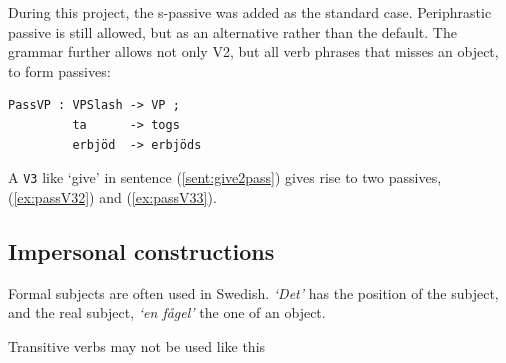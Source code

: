 \documentclass{report}
\begin{document}
During this project, the s-passive was added as the standard case.
Periphrastic passive is still allowed, but as an alternative rather
than the default.
The grammar further allows not only V2, but all verb phrases that misses an object, to 
form passives:
\begin{verbatim}
PassVP : VPSlash -> VP ;
         ta      -> togs
         erbjöd  -> erbjöds
\end{verbatim}
A \verb-V3- like `give' in sentence (\ref{sent:give2pass}) gives rise to two
passives, (\ref{ex:passV32}) and (\ref{ex:passV33}).
\label{sent:give2pass}
\label{ex:passV32}
\label{ex:passV33}
\label{ex:passV2A}

\subsection{Impersonal constructions}%
\label{sec:Formal}
Formal subjects \cite[]{SAG} are often used in Swedish.
\emph{`Det'} has the position of the subject, and the real subject, 
\emph{`en fågel'} the one of an object.

Transitive verbs may not be used like this
\label{sent:fagelfron}
\end{document}
